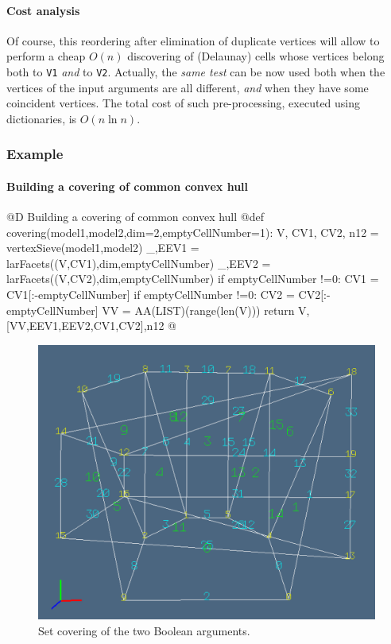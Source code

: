 \documentclass[11pt,oneside]{article}	%
\begin{document}
\paragraph{Cost analysis} 
Of course, this reordering after elimination of duplicate vertices will allow to perform a cheap $O(n)$ discovering of (Delaunay) cells whose vertices belong both to \texttt{V1} \emph{and} to \texttt{V2}. 
Actually, the \emph{same test} can be now used both when the vertices of the input arguments are all different, \emph{and} when they have some coincident vertices.
The total cost of such pre-processing, executed using dictionaries, is $O(n\ln n)$.


\subsubsection{Example}

\paragraph{Building a covering of common convex hull}

@D Building a covering of common convex hull
@{def covering(model1,model2,dim=2,emptyCellNumber=1):
	V, CV1, CV2, n12 = vertexSieve(model1,model2)
	_,EEV1 = larFacets((V,CV1),dim,emptyCellNumber)
	_,EEV2 = larFacets((V,CV2),dim,emptyCellNumber)
	if emptyCellNumber !=0: CV1 = CV1[:-emptyCellNumber]
	if emptyCellNumber !=0: CV2 = CV2[:-emptyCellNumber]
	VV = AA(LIST)(range(len(V)))
	return V,[VV,EEV1,EEV2,CV1,CV2],n12
@}

\begin{figure}[htbp] %
   \centering
   \includegraphics[width=0.6\linewidth]{images/covering} 
   \caption{Set covering of the two Boolean arguments.}
   \label{fig:example}
\end{figure}
\end{document}
